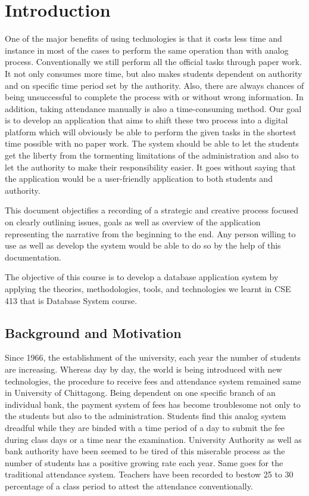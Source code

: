
\section{Introduction}\label{sec:introduction}
One of the major benefits of using technologies is that it costs less time and instance in most of the cases to perform the same operation than with analog process. Conventionally we still perform all the official tasks through paper work. It not only consumes more time, but also makes students dependent on authority and on specific time period set by the authority. Also, there are always chances of being unsuccessful to complete the process with or without wrong information. In addition, taking attendance manually is also a time-consuming method. Our goal is to develop an application that aims to shift these two process into a digital platform which will obviously be able to perform the given tasks in the shortest time possible with no paper work. The system should be able to let the students get the liberty from the tormenting limitations of the administration and also to let the authority to make their responsibility easier. It goes without saying that the application would be a user-friendly application to both students and authority.

This document objectifies  a recording of a strategic and creative process focused on clearly outlining issues, goals as well as overview of the application representing the narrative from the beginning to the end. Any person willing to use as well as develop the system would be able to do so by the help of this documentation.

The objective of this course is to develop a database application system by applying the theories, methodologies, tools, and technologies we learnt in CSE 413 that is Database System course.  

\clearpage


\subsection{Background and Motivation}\label{subsec:bm}

Since 1966, the establishment of the university, each year the number of students are increasing. Whereas day by day, the world is being introduced with new technologies, the procedure to receive fees and attendance system remained same in University of Chittagong. Being dependent on one specific branch of an individual bank, the payment system of fees has become troublesome not only to the students but also to the administration. Students find this analog system dreadful while they are binded with a time period of a day to submit the fee during class days or a time near the examination. University Authority as well as bank authority have been seemed to be tired of this miserable process as the number of students has a positive growing rate each year. Same goes for the traditional attendance system. Teachers have been recorded to bestow 25 to 30 percentage of a class period to attest the attendance conventionally.

